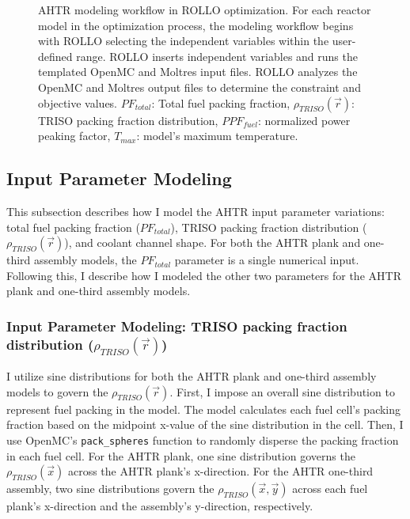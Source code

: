 \begin{figure}[htbp]
    \caption{\acrfull{AHTR} modeling workflow in \acrfull{ROLLO} optimization.
    For each reactor model in the optimization process, the modeling workflow begins 
    with ROLLO selecting the independent variables within the user-defined range. 
    ROLLO inserts independent variables and runs the templated OpenMC and Moltres 
    input files. 
    ROLLO analyzes the OpenMC and Moltres output files to determine the constraint and 
    objective values.
    $PF_{total}$: Total fuel packing fraction, $\rho_{TRISO}(\vec{r})$: TRISO packing 
    fraction distribution, $PPF_{fuel}$: normalized power peaking factor, 
    $T_{max}$: model's maximum temperature.} 
    \label{fig:ahtr-model-flow}
\end{figure}

\subsection{Input Parameter Modeling}
\label{sec:input-parameter-modeling}
This subsection describes how I model the \gls{AHTR} input parameter variations: 
total fuel packing fraction ($PF_{total}$), \gls{TRISO} packing fraction distribution
($\rho_{TRISO}(\vec{r})$), and coolant channel shape. 
For both the \gls{AHTR} plank and one-third assembly models, the $PF_{total}$ parameter 
is a single numerical input.
Following this, I describe how I modeled the other two parameters for 
the \gls{AHTR} plank and one-third assembly models. 

\subsubsection{Input Parameter Modeling: TRISO packing fraction distribution 
($\rho_{TRISO}(\vec{r})$)}
I utilize sine distributions for both the \gls{AHTR} plank and one-third assembly 
models to govern the $\rho_{TRISO}(\vec{r})$.
First, I impose an overall sine distribution to represent fuel packing in the model. 
The model calculates each fuel cell's packing fraction based on the midpoint 
x-value of the sine distribution in the cell. 
Then, I use OpenMC's \texttt{pack\_spheres} function to randomly disperse 
the packing fraction in each fuel cell. 
For the \gls{AHTR} plank, one sine distribution governs the $\rho_{TRISO}(\vec{x})$ 
across the \gls{AHTR} plank's x-direction. 
For the \gls{AHTR} one-third assembly, two sine distributions govern the 
$\rho_{TRISO}(\vec{x}, \vec{y})$ across each fuel plank's x-direction and the 
assembly's y-direction, respectively. 

